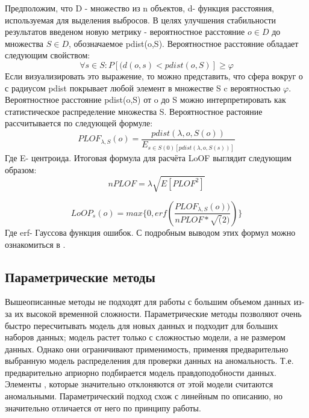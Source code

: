  Предположим, что D - множество из n объектов, d- функция расстояния, используемая для выделения выбросов. В целях улучшения стабильности результатов введеном новую метрику - вероятностное расстояние 
 $o \in D$ до  множества $S \in D$, обозначаемое pdist(o,S).
 Вероятностное расстояние обладает следующим свойством:
 \begin{equation}
 \forall s \in S : P[(d(o,s)<pdist(o,S)] \geq \varphi
 \end{equation}
 Если визуализировать это выражение, то можно представить, что сфера вокруг о с радиусом pdist покрывает любой элемент в множестве S c вероятностью $\varphi$. Вероятностное расстояние pdist(o,S) от o до S можно интерпретировать как статистическое распределение множества S. 
 Вероятностное растояние рассчитывается по следующей формуле:
 \begin{equation}
 PLOF_{\lambda,S}(o)=\frac{pdist(\lambda,o, S(o))}{E_{s \in S(0)[pdist(\lambda,o, S(s))]}}
 \end{equation}
 Где E- центроида.
 Итоговая формула для расчёта LoOF выглядит следующим образом:
 \begin{equation}
 nPLOF=\lambda\sqrt{E[PLOF^2]}
 \end{equation}

  \begin{equation}
  LoOP_s(o)=max\{0,erf(\frac{PLOF_{\lambda,S}(o))}{nPLOF*\sqrt(2)})\}
  \end{equation}
 Где erf- Гауссова функция ошибок.
 С подробным выводом этих формул можно ознакомиться в \cite{Book18}.
\subsection{Параметрические методы}
Вышеописанные методы не подходят для работы с большим объемом данных из-за их высокой временной сложности.
Параметрические методы позволяют очень быстро пересчитывать модель для
новых данных и подходит для больших наборов данных; модель растет
только с сложностью модели, а не размером данных. Однако они ограничивают
применимость,  применяя предварительно выбранную модель распределения для проверки данных на аномальность. Т.е. предварительно априорно подбирается модель правдоподобности данных. Элементы , которые значительно отклоняются от этой модели считаются аномальными. Параметрический подход схож с линейным по описанию, но значительно отличается от него по принципу работы.

